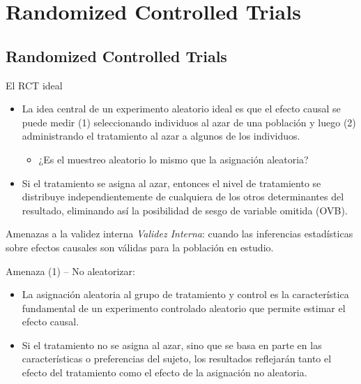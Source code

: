 \documentclass[11pt, aspectratio=169, compress]{beamer}
\begin{document}
\section{Randomized Controlled Trials}
\subsection{Randomized Controlled Trials}
\begin{frame}{El RCT ideal}
	\begin{itemize}
	\item La idea central de un experimento aleatorio ideal es que el efecto causal se puede medir (1) seleccionando individuos al azar de una población y luego (2) administrando el tratamiento al azar a algunos de los individuos.
	\begin{itemize}
		\item ¿Es el muestreo aleatorio lo mismo que la asignación aleatoria?
	\end{itemize}
	\item Si el tratamiento se asigna al azar, entonces el nivel de tratamiento se distribuye independientemente de cualquiera de los otros determinantes del resultado, eliminando así la posibilidad de sesgo de variable omitida (OVB).
	\end{itemize}
\end{frame}
\begin{frame}{Amenazas a la validez interna}
	\textit{Validez Interna}: cuando las inferencias estadísticas sobre efectos causales son válidas para la población en estudio.
	
	Amenaza (1) -- No aleatorizar:
	\begin{itemize}
		\item La asignación aleatoria al grupo de tratamiento y control es la característica fundamental de un experimento controlado aleatorio que permite estimar el efecto causal.
		
		\item Si el tratamiento no se asigna al azar, sino que se basa en parte en las características o preferencias del sujeto, los resultados reflejarán tanto el efecto del tratamiento como el efecto de la asignación no aleatoria.
	\end{itemize}
\end{frame}
\end{document}
